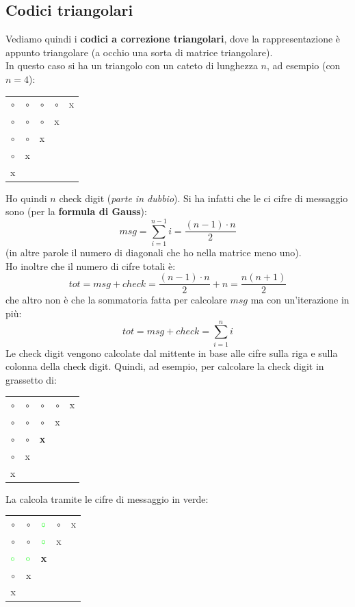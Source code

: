 \documentclass[a4paper,12pt, oneside]{book}
\begin{document}
\subsection{Codici triangolari}
Vediamo quindi i \textbf{codici a correzione triangolari}, dove la
rappresentazione è appunto triangolare (a occhio una sorta di matrice
triangolare).\\ 
In questo caso si ha un triangolo con un cateto di lunghezza $n$, ad esempio
(con $n=4$): 
\begin{table}[H]
  \centering
  \begin{tabular}{ccccc}
    $\circ$ & $\circ$ & $\circ$ &$\circ$  & x\\
    $\circ$ & $\circ$ & $\circ$  & x&\\
    $\circ$ & $\circ$ & x&&\\
    $\circ$ &x&&&\\
    x&&&&
  \end{tabular}
\end{table}
Ho quindi $n$ check digit (\textit{parte in dubbio}). Si ha infatti che le ci
cifre di messaggio sono (per la \textbf{formula di Gauss}):
\[msg=\sum_{i=1}^{n-1}i=\frac{(n-1)\cdot n}{2}\]
(in altre parole il numero di diagonali che ho nella matrice meno uno).\\
Ho inoltre che il numero di cifre totali è:
\[tot=msg+check=\frac{(n-1)\cdot n}{2}+n=\frac{n(n+1)}{2}\]
che altro non è che la sommatoria fatta per calcolare $msg$ ma con un'iterazione
in più:
\[tot=msg+check=\sum_{i=1}^{n}i\]
Le check digit vengono calcolate dal mittente in base alle cifre sulla riga e
sulla colonna della check digit. Quindi, ad esempio, per calcolare la check
digit in grassetto di:
\begin{table}[H]
  \centering
  \begin{tabular}{ccccc}
    $\circ$ & $\circ$ & $\circ$ &$\circ$  & x\\
    $\circ$ & $\circ$ & $\circ$  & x&\\
    $\circ$ & $\circ$ & \textbf{x}&&\\
    $\circ$ &x&&&\\
    x&&&&
  \end{tabular}
\end{table}
La calcola tramite le cifre di messaggio in verde:
\begin{table}[H]
  \centering
  \begin{tabular}{ccccc}
    $\circ$ & $\circ$ & ${\color{green}\circ}$ &$\circ$  & x\\
    $\circ$ & $\circ$ & ${\color{green}\circ}$  & x&\\
    ${\color{green}\circ}$ & ${\color{green}\circ}$ & \textbf{x}&&\\
    $\circ$ &x&&&\\
    x&&&&
  \end{tabular}
\end{table}
\end{document}
